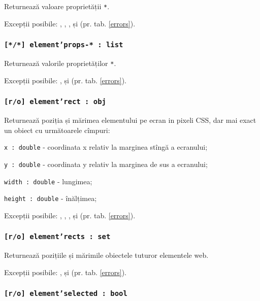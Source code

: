 Returnează valoare proprietății \texttt{*}.

Excepții posibile: , , ,  și  (pr. tab. \ref{errors}).

\subsubsection{\texttt{[*/*] element'props-* : list}}

Returnează valorile proprietăților \texttt{*}.

Excepții posibile: ,  și  (pr. tab. \ref{errors}).

\subsubsection{\texttt{[r/o] element'rect : obj}}

Returnează poziția și mărimea elementului pe ecran in pixeli CSS, dar mai exact un obiect cu următoarele cîmpuri:
\begin{icItems}
	\item \texttt{x : double} - coordinata x relativ la marginea stîngă a ecranului;
	\item \texttt{y : double} - coordinata y relativ la marginea de sus a ecranului;
	\item \texttt{width : double} - lungimea;
	\item \texttt{height : double} - înălțimea;
\end{icItems}

Excepții posibile: , , ,  și  (pr. tab. \ref{errors}).

\subsubsection{\texttt{[r/o] element'rects : set}}

Returnează pozițiile și mărimile obiectele tuturor elementele web.

Excepții posibile: ,  și  (pr. tab. \ref{errors}).

\subsubsection{\texttt{[r/o] element'selected : bool}}

